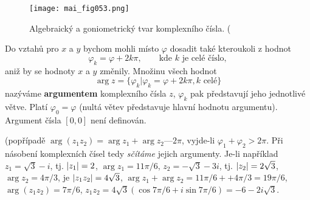     \begin{figure}[ht!]  %
      \centering
      \texttt{[image: mai\_fig053.png]}
      \caption{Algebraický a goniometrický tvar komplexního čísla. (\cite[s.~20]{Musilova2009MA1}}
      \label{mai:fig053}
    \end{figure}

    Do vztahů pro \(x\) a \(y\) bychom mohli místo \(\varphi\) dosadit také kteroukoli z hodnot 
    \begin{equation*}
      \varphi_k = \varphi + 2k\pi,\qquad \text{kde }k\text{ je celé číslo}, 
    \end{equation*}
    aniž by se hodnoty \(x\) a \(y\) změnily. Množinu všech hodnot
    \begin{equation*}
      \arg{z} = \{\varphi_k|\varphi_k = \varphi + 2k\pi, k\text{ celé}\}
    \end{equation*}
    nazýváme \textbf{argumentem} komplexního čísla \(z\), \(\varphi_k\) pak představují jeho 
    jednotlivé větve. Platí \(\varphi_0 = \varphi\) (nultá větev představuje hlavní hodnotu 
    argumentu). Argument čísla \([0, 0]\) není definován. 
      
    
    
    (popřípadě \(\arg{(z_1z_2)} = \arg{z_1} + \arg{z_2} — 2\pi\), vyjde-li \(\varphi_1+\varphi_2 > 
    2\pi\). Při násobení komplexních čísel tedy \emph{sčítáme} jejich argumenty. Je-li například 
    \(z_1=\sqrt{3} - i\), tj. \(\lvert z_1\rvert = 2\), \(\arg{z_1} = 11\pi/6\), \(z_2 = -\sqrt{3} - 3i\), 
    tj. \(\lvert z_2\rvert = 2\sqrt{3}\), \(\arg{z_2} = 4\pi/3\), je \(\lvert z_1z_2\rvert = 4\sqrt{3}\), 
    \(\arg{z_1} + \arg{z_2} = 11\pi/6 + + 4\pi/3 = 19\pi/6\), \(\arg{(z_1z_2)} = 7\pi/ 6\), 
    \(z_1z_2 = 4\sqrt{3}(\cos7\pi/6 + i\sin7\pi/6)= -6 -2i\sqrt{3}\). 
    
